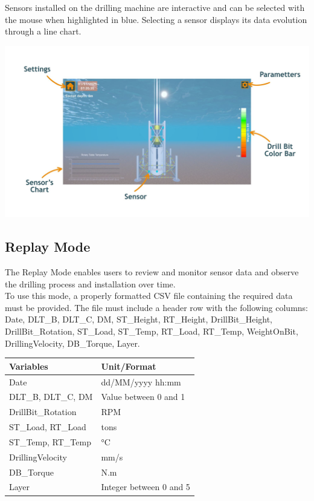 \documentclass{article}
\begin{document}
Sensors installed on the drilling machine are interactive and can be selected with the mouse when highlighted in blue. Selecting a sensor displays its data evolution through a line chart.
\begin{center}
    \includegraphics[width=6in]{DrillingMode.jpg}
\end{center}

\subsection{Replay Mode}\hfill

The Replay Mode enables users to review and monitor sensor data and observe the drilling process and installation over time.\\

To use this mode, a properly formatted CSV file containing the required data must be provided. The file must include a header row with the following columns:\\
Date, DLT\_B, DLT\_C, DM, ST\_Height, RT\_Height, DrillBit\_Height, DrillBit\_Rotation, ST\_Load, ST\_Temp, RT\_Load, RT\_Temp, WeightOnBit, DrillingVelocity, DB\_Torque, Layer.\\
\begin{table}[h]
    \begin{tabular}{|l|l|}
        \hline
        \textbf{Variables} & \textbf{Unit/Format}\\
        \hline
        Date & dd/MM/yyyy hh:mm\\
        \hline
        DLT\_B, DLT\_C, DM & Value between 0 and 1\\
        \hline
        DrillBit\_Rotation & RPM\\
        \hline
        ST\_Load, RT\_Load & tons\\
        \hline
        ST\_Temp, RT\_Temp & °C\\
        \hline
        DrillingVelocity & mm/s\\
        \hline
        DB\_Torque & N.m\\
        \hline
        Layer & Integer between 0 and 5\\
        \hline
    \end{tabular}
\end{table}
\end{document}
